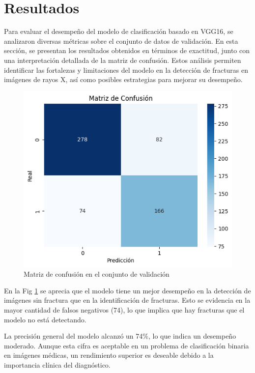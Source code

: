 \documentclass[journal]{IEEEtran}
\begin{document}
\section{Resultados}
Para evaluar el desempeño del modelo de clasificación basado en VGG16, se analizaron diversas métricas sobre el conjunto de datos de validación. En esta sección, se presentan los resultados obtenidos en términos de exactitud, junto con una interpretación detallada de la matriz de confusión. Estos análisis permiten identificar las fortalezas y limitaciones del modelo en la detección de fracturas en imágenes de rayos X, así como posibles estrategias para mejorar su desempeño.
\begin{figure}
    \centering
    \includegraphics[width=0.9\linewidth]{Figs/CM.png}
    \caption{Matriz de confusión en el conjunto de validación}
    \label{CM}
\end{figure}

En la Fig \ref{CM} se aprecia que el modelo tiene un mejor desempeño en la detección de imágenes sin fractura que en la identificación de fracturas. Esto se evidencia en la mayor cantidad de falsos negativos (74), lo que implica que hay fracturas que el modelo no está detectando. 

La precisión general del modelo alcanzó un 74\%, lo que indica un desempeño moderado. Aunque esta cifra es aceptable en un problema de clasificación binaria en imágenes médicas, un rendimiento superior es deseable debido a la importancia clínica del diagnóstico.
\end{document}
